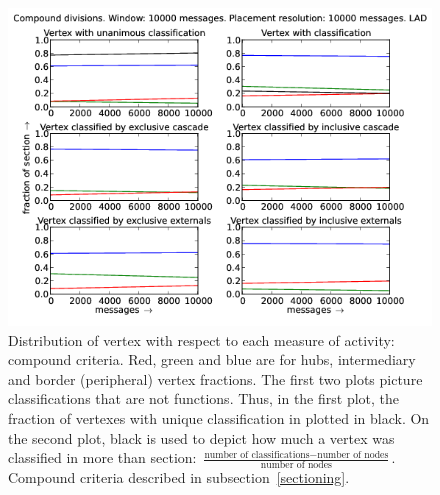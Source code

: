 \documentclass[%
 aip,
 jmp,%
 amsmath,amssymb,
 reprint,%
]{revtex4-1}
\begin{document}
\begin{figure}[hbtp] 
   \centering
        \includegraphics[width=\textwidth]{figs/LAD/10000_2}
    \caption{Distribution of vertex with respect to each measure of activity: compound criteria. Red, green and blue are for hubs, intermediary and border (peripheral) vertex fractions. The first two plots picture classifications that are not functions. Thus, in the first plot, the fraction of vertexes with unique classification in plotted in black. On the second plot, black is used to depict how much a vertex was classified in more than section: $\frac{\text{number of classifications} - \text{number of nodes}}{\text{number of nodes}}$. Compound criteria described in subsection~\ref{sectioning}.}
    \label{fig:lad10000_}
\end{figure}
\end{document}
